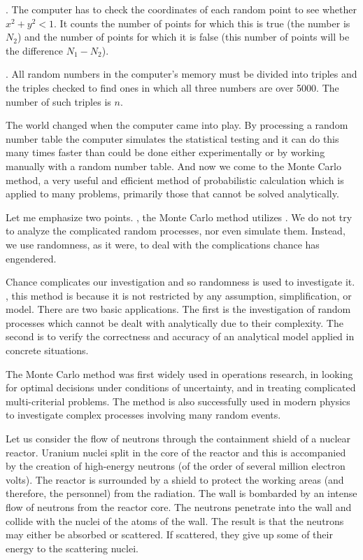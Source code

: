 . The computer has to check the coordinates of each
random point to see whether $x^{2} + y^{2} < 1$. It counts the number of points
for which this is true (the number is $N_{2}$) and the number of points for
which it is false (this number of points will be the difference $N_{1} - N_{2}$).

. All random numbers in the computer's memory must
be divided into triples and the triples checked to find ones in which all three numbers are over 5000. The number of such triples is $n$.

 The world changed when the computer
came into play. By processing a random number table the computer
simulates the statistical testing and it can do this many times faster than
could be done either experimentally or by working manually with
a random number table. And now we come to the Monte Carlo method,
a very useful and efficient method of probabilistic calculation which is
applied to many problems, primarily those that cannot be solved
analytically.

Let me emphasize two points. , the Monte Carlo method
utilizes . We do not try to analyze the complicated random processes, nor even simulate them. Instead, we use randomness, as it were, to deal with the complications chance has engendered.

Chance complicates our investigation and so randomness is used to
investigate it. , this method is  because it is not restricted by any assumption, simplification, or model. There are two
basic applications. The first is the investigation of random processes
which cannot be dealt with analytically due to their complexity. The
second is to verify the correctness and accuracy of an analytical model
applied in concrete situations.

The Monte Carlo method was first widely used in operations research,
in looking for optimal decisions under conditions of uncertainty, and in
treating complicated multi-criterial problems. The method is also successfully
used in modern physics to investigate complex processes involving
many random events.

 Let us consider the
flow of neutrons through the containment shield of a nuclear reactor.
Uranium nuclei split in the core of the reactor and this is accompanied
by the creation of high-energy neutrons (of the order of several million
electron volts). The reactor is surrounded by a shield to protect the
working areas (and therefore, the personnel) from the radiation. The
wall is bombarded by an intense flow of neutrons from the reactor core.
The neutrons penetrate into the wall and collide with the nuclei of the
atoms of the wall. The result is that the neutrons may either be
absorbed or scattered. If scattered, they give up some of their energy to
the scattering nuclei.

